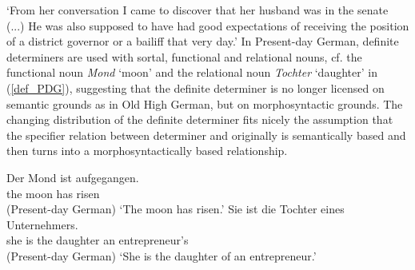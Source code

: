 \documentclass[output=paper
	        ,collection
	        ,collectionchapter
 	        ,biblatex
                ,babelshorthands
                ,newtxmath
                ,draftmode
                ,colorlinks, citecolor=brown
]{./langsci/langscibook}
\begin{document}
\glt `From her conversation I came to discover that her husband was in the senate (...) He was also supposed to have had good expectations of receiving the position of a district governor or a bailiff that very day.'
\zl
In Present-day German, definite determiners are used with sortal, functional and relational nouns, cf. the functional noun \textit{Mond} `moon' and the relational noun \textit{Tochter} `daughter' in (\ref{def_PDG}), suggesting that the definite determiner is no longer licensed on semantic grounds as in Old High German, but on morphosyntactic grounds. The changing distribution of the definite determiner fits nicely the assumption that the specifier relation between determiner and \nom {} originally is semantically based and then turns into a morphosyntactically based relationship.

\eal \label{def_PDG}
\ex 
\gll Der Mond ist aufgegangen. \\ the moon has risen \\ \hfill (Present-day German)
\glt `The moon has risen.'
\ex 
\gll Sie ist die Tochter eines Unternehmers. \\  she is the daughter an entrepreneur's    \\ \hfill (Present-day German)
\glt `She is the daughter of an entrepreneur.'  
\zl
\end{document}

